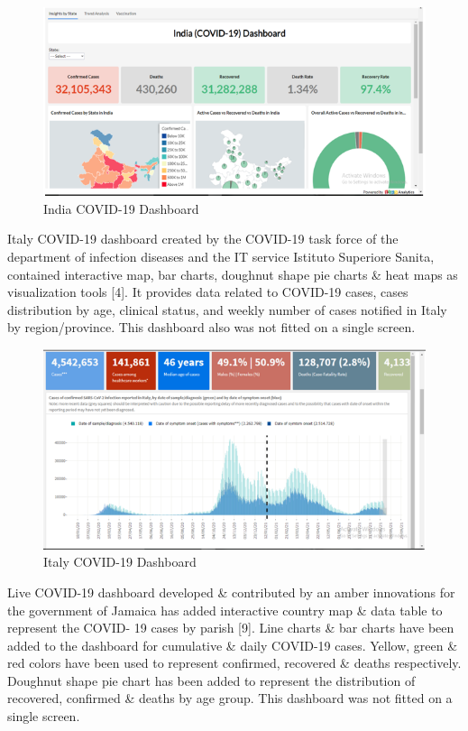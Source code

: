 \documentclass[
]{article}
\begin{document}
\begin{figure}
\includegraphics[width=8.42in]{Images/9} \caption{India COVID-19 Dashboard}\label{fig:unnamed-chunk-16}
\end{figure}

Italy COVID-19 dashboard created by the COVID-19 task force of the
department of infection diseases and the IT service Istituto Superiore
Sanita, contained interactive map, bar charts, doughnut shape pie charts
\& heat maps as visualization tools {[}4{]}. It provides data related to
COVID-19 cases, cases distribution by age, clinical status, and weekly
number of cases notified in Italy by region/province. This dashboard
also was not fitted on a single screen.

\begin{figure}
\includegraphics[width=8.12in]{Images/10} \caption{Italy COVID-19 Dashboard}\label{fig:unnamed-chunk-17}
\end{figure}

Live COVID-19 dashboard developed \& contributed by an amber innovations
for the government of Jamaica has added interactive country map \& data
table to represent the COVID- 19 cases by parish {[}9{]}. Line charts \&
bar charts have been added to the dashboard for cumulative \& daily
COVID-19 cases. Yellow, green \& red colors have been used to represent
confirmed, recovered \& deaths respectively. Doughnut shape pie chart
has been added to represent the distribution of recovered, confirmed \&
deaths by age group. This dashboard was not fitted on a single screen.
\end{document}

